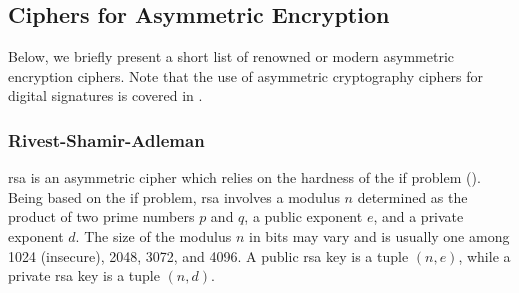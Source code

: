 \subsection{Ciphers for Asymmetric Encryption}\label{sec:asymmetric_cryptography:ciphers}

Below, we briefly present a short list of renowned or modern asymmetric encryption ciphers. Note that the use of asymmetric cryptography ciphers for digital signatures is covered in .

\subsubsection{Rivest-Shamir-Adleman}\label{sec:asymmetric_cryptography:ciphers:rsa}

\gls{rsa} \cite{rivest_method_1978} is an asymmetric cipher which relies on the hardness of the \gls{if} problem (). Being based on the \gls{if} problem, \gls{rsa} involves a modulus $n$ determined as the product of two prime numbers $p$ and $q$, a public exponent $e$, and a private exponent $d$. The size of the modulus $n$ in bits may vary and is usually one among 1024 (insecure), 2048, 3072, and 4096. A public \gls{rsa} key is a tuple $(n, e)$, while a private \gls{rsa} key is a tuple $(n, d)$.



